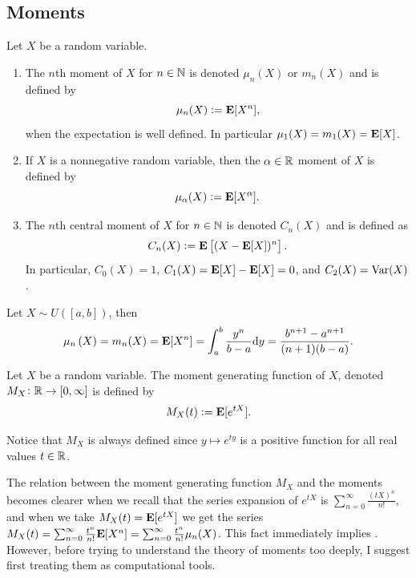 \documentclass[11pt,a4paper]{article}
\begin{document}
\subsection{Moments}
\begin{definition}[Moments]
  Let $X$ be a random variable.
  \begin{enumerate}
    \item[(1)] The $n$th moment of $X$ for $n \in \mathbb{N}$ is denoted $\mu_n(X)$ or
    $m_n(X)$ and is defined by
    \[
      \mu_n(X) := \mathbf{E}[X^n],
    \]
    when the expectation is well defined.
    In particular $\mu_1(X) = m_1(X) = \mathbf{E}[X]$.
    \item[(2)] If $X$ is a nonnegative random variable, then the $\alpha \in \mathbb{R}$
    moment of $X$ is defined by
    \[
      \mu_\alpha(X) := \mathbf{E}[X^{\alpha}].
    \]
    \item[(3)] The $n$th central moment of $X$ for $n \in \mathbb{N}$ is denoted
    $C_n(X)$ and is defined as
    \[
      C_n(X) := \mathbf{E}\left[(X - \mathbf{E}[X])^n\right].
    \]
    In particular, $C_0(X) = 1$, $C_1(X) = \mathbf{E}[X] - \mathbf{E}[X] = 0$,
    and $C_2(X) = \operatorname{Var}(X)$.
  \end{enumerate}
\end{definition}

\begin{example}
  Let $X \sim U([a,b])$, then
  \[
    \mu_{n} \left(X\right) = m_n(X) =
    \E[X^{n}] =
    \int_{a}^{b}{\frac{y^{n}}{b-a}} \dy =
    {\frac{b^{n+1}-a^{n+1}}{(n+1)(b-a)}}.
  \]
\end{example}

\begin{definition}
  Let $X$ be a random variable. The moment generating function of $X$,
  denoted $M_X \colon \mathbb{R} \to [0,\infty]$ is defined by
  \[
    M_X(t) := \mathbf{E}[e^{tX}].
  \]
\end{definition}
\begin{remark}
  Notice that $M_X$ is always defined since $y \mapsto e^{ty}$ is a positive
  function for all real values $t \in \mathbb{R}$.
\end{remark}

\begin{remark}
  The relation between the moment generating function $M_X$ and
  the moments becomes clearer when we recall that
  the series expansion of $e^{tX}$ is
  $\sum_{n=0}^{\infty} \frac{(tX)^{n}}{n!}$,
  and when we take $M_X(t) = \mathbf{E}[e^{tX}]$ we get
  the series
  $M_X(t) = \sum_{n=0}^{\infty} \frac{t^{n}}{n!} \mathbf{E}[X^n] =
  \sum_{n=0}^{\infty} \frac{t^{n}}{n!} \mu_n(X)$.
  This fact immediately implies .
  However, before trying to understand the theory of moments
  too deeply, I suggest first treating them as computational
  tools.
\end{remark}
\end{document}
